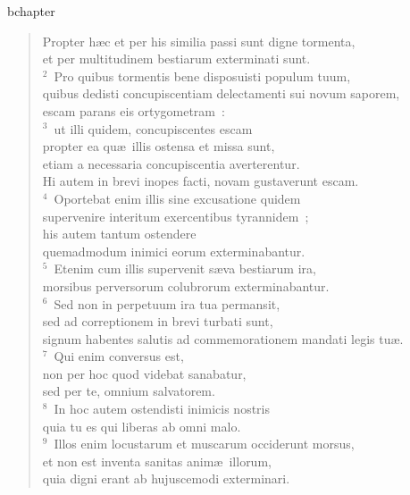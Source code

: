bchapter\begin{flushleft}\begin{verse}\vspace{-19pt}\hspace{6pt}Propter h\ae c et per his similia passi sunt digne tormenta,\\\hspace{6pt} et per multitudinem bestiarum exterminati sunt.\\
${}^{2}$~Pro quibus tormentis bene disposuisti populum tuum,\\ quibus dedisti concupiscentiam delectamenti sui novum saporem,\\ escam parans eis ortygometram~:\\
${}^{3}$~ut illi quidem, concupiscentes escam\\ propter ea qu\ae\ illis ostensa et missa sunt,\\ etiam a necessaria concupiscentia averterentur.\\ Hi autem in brevi inopes facti, novam gustaverunt escam.\\
${}^{4}$~Oportebat enim illis sine excusatione quidem\\ supervenire interitum exercentibus tyrannidem~;\\ his autem tantum ostendere\\ quemadmodum inimici eorum exterminabantur.\\
${}^{5}$~Etenim cum illis supervenit s\ae va bestiarum ira,\\ morsibus perversorum colubrorum exterminabantur.\\
${}^{6}$~Sed non in perpetuum ira tua permansit,\\ sed ad correptionem in brevi turbati sunt,\\ signum habentes salutis ad commemorationem mandati legis tu\ae .\\
${}^{7}$~Qui enim conversus est,\\ non per hoc quod videbat sanabatur,\\ sed per te, omnium salvatorem.\\
${}^{8}$~In hoc autem ostendisti inimicis nostris\\ quia tu es qui liberas ab omni malo.\\
${}^{9}$~Illos enim locustarum et muscarum occiderunt morsus,\\ et non est inventa sanitas anim\ae\ illorum,\\ quia digni erant ab hujuscemodi exterminari.\\

\end{verse}
\end{flushleft}
